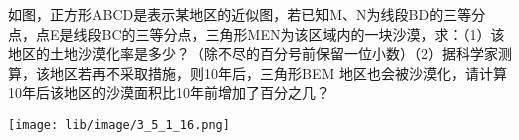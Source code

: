 如图，正方形ABCD是表示某地区的近似图，若已知M、N为线段BD的三等分点，点E是线段BC的三等分点，三角形MEN为该区域内的一块沙漠，求：（1）该地区的土地沙漠化率是多少？（除不尽的百分号前保留一位小数）（2）据科学家测算，该地区若再不采取措施，则10年后，三角形BEM 地区也会被沙漠化，请计算10年后该地区的沙漠面积比10年前增加了百分之几？

\begin{flushright}

    \texttt{[image: lib/image/3\_5\_1\_16.png]}

\end{flushright}



